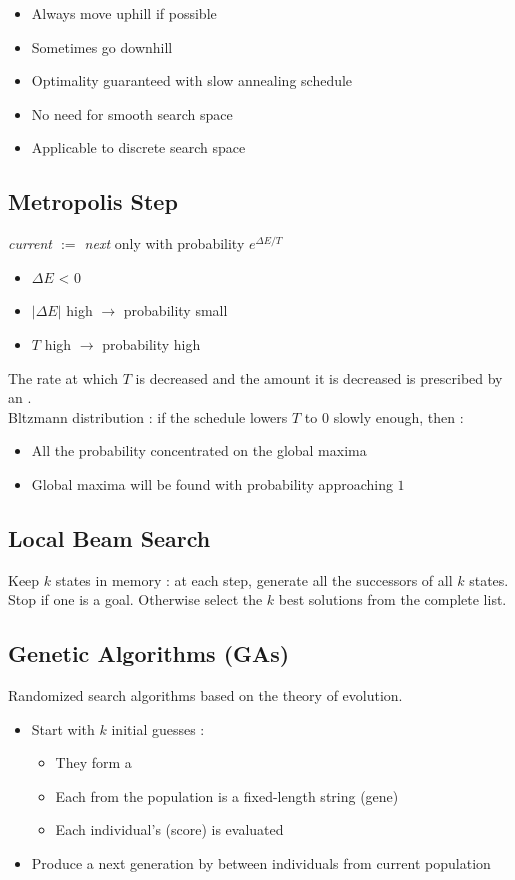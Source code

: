 \begin{itemize}
\item Always move uphill if possible
\item Sometimes go downhill
\item Optimality guaranteed with slow annealing schedule
\item No need for smooth search space
\item Applicable to discrete search space
\end{itemize}

\subsection{Metropolis Step}
\textit{current $:=$ next} only with probability $e^{\Delta E/T}$ 
\begin{itemize}
\item $\Delta E$ < 0
\item $|\Delta E|$ high $\rightarrow$ probability small
\item$T$ high $\rightarrow$ probability high
\end{itemize}

The rate at which $T$ is decreased and the amount it is decreased is prescribed by an .\\
Bltzmann distribution : if the schedule lowers $T$ to $0$ slowly enough, then :
\begin{itemize}
\item All the probability concentrated on the global maxima
\item Global maxima will be found with probability approaching $1$
\end{itemize}

\subsection{Local Beam Search}
Keep $k$ states in memory : at each step, generate all the successors of all $k$ states. Stop if one is a goal. Otherwise select the $k$ best solutions from the complete list.

\newpage
\subsection{Genetic Algorithms (GAs)}

Randomized search algorithms based on the theory of evolution.
\begin{itemize}
\item Start with $k$ initial guesses :
	\begin{itemize}
	\item They form a 
	\item Each  from the population is a fixed-length string (gene)
	\item Each individual's  (score) is evaluated
	\end{itemize}
\item Produce a next generation by  between individuals from current population
\end{itemize}

